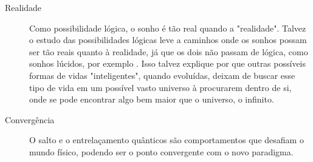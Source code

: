 \begin{description}
	   \item[Realidade] Como possibilidade lógica, o sonho é tão real quando a "realidade". Talvez o estudo das possibilidades lógicas leve a caminhos onde os sonhos possam ser tão reais quanto à realidade, já que os dois não passam de lógica, como sonhos lúcidos, por exemplo \cite{ administradores_principio_pareto}. Isso talvez explique por que outras possíveis formas de vidas "inteligentes", quando evoluídas, deixam de buscar esse tipo de vida em um possível vasto universo à procurarem dentro de si, onde se pode encontrar algo bem maior que o universo, o infinito.
	   \item[Convergência] O salto e o entrelaçamento quânticos são comportamentos que desafiam o mundo físico, podendo ser o ponto convergente com o novo paradigma.
	\end{description}